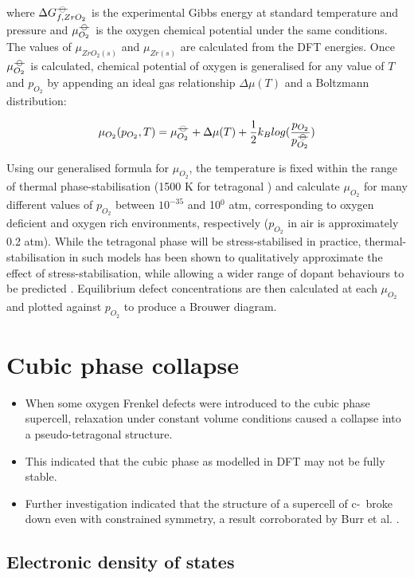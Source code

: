 where $\Delta{G^{{\ensuremath{-\kern-4pt{\ominus}\kern-4pt-}}}_{f, ZrO_2}}$ is the experimental Gibbs energy at standard temperature and pressure and $\mu^{{-\kern-4pt{\ominus}\kern-4pt-}}_{O_2}$ is the oxygen chemical potential under the same conditions. The values of $\mu_{ZrO_2(s)}$ and $\mu_{Zr(s)}$ are calculated from the DFT energies. Once $\mu^{{-\kern-4pt{\ominus}\kern-4pt-}}_{O_2}$ is calculated, chemical potential of oxygen is generalised for any value of $T$ and $p_{O_2}$ by appending an ideal gas relationship $\Delta{\mu(T)}$ and a Boltzmann distribution:

\begin{equation}
\mu_{O_2}(p_{O_2},T) = \mu^{{-\kern-4pt{\ominus}\kern-4pt-}}_{O_2} + \Delta{\mu(T)} + \frac{1}{2}{k_B}log(\frac{p_{O_2}}{p^{{-\kern-4pt{\ominus}\kern-4pt-}}_{O_2}})
\end{equation}

Using our generalised formula for $\mu_{O_2}$, the temperature is fixed within the range of thermal phase-stabilisation (1500 K for tetragonal \zirconia) and calculate $\mu_{O_2}$ for many different values of $p_{O_2}$ between $10^{-35}$ and 10$^{0}$ atm, corresponding to oxygen deficient and oxygen rich environments, respectively ($p_{O_2}$ in air is approximately 0.2 atm). While the tetragonal phase will be stress-stabilised in practice, thermal-stabilisation in such models has been shown to qualitatively approximate the effect of stress-stabilisation, while allowing a wider range of dopant behaviours to be predicted \cite{Bell2016}. Equilibrium defect concentrations are then calculated at each $\mu_{O_2}$ and plotted against $p_{O_2}$ to produce a Brouwer diagram. 

\section{Cubic phase collapse}

\begin{itemize}
\item When some oxygen Frenkel defects were introduced to the cubic phase supercell, relaxation under constant volume conditions caused a collapse into a pseudo-tetragonal structure.
\item This indicated that the cubic phase as modelled in DFT may not be fully stable.
\item Further investigation indicated that the structure of a supercell of c-\zirconia\ broke down even with constrained symmetry, a result corroborated by Burr et al. \cite{burr2017importance}. 
\end{itemize}

\subsection{Electronic density of states}

